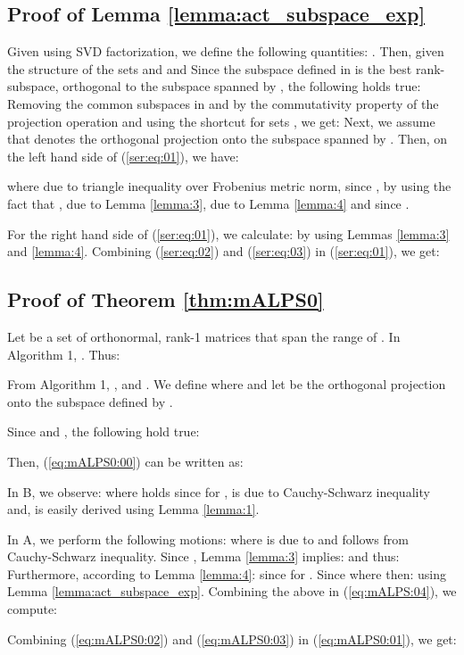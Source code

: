 \documentclass[twocolumn]{svjour3}
\begin{document}
\subsection{Proof of Lemma \ref{lemma:act_subspace_exp}}

Given  using SVD factorization, we define the following quantities: . Then, given the structure of the sets  and 
 and 
 Since the subspace defined in  is the best rank- subspace, orthogonal to the subspace spanned by , the following holds true:
 Removing the common subspaces in  and  by the commutativity property of the projection operation and using the shortcut  for sets , we get:
 Next, we assume that  denotes the orthogonal projection onto the subspace spanned by . Then, on the left hand side of (\ref{ser:eq:01}), we have:


 where  due to triangle inequality over Frobenius metric norm,  since ,  by using the fact that ,  due to Lemma \ref{lemma:3},  due to Lemma \ref{lemma:4} and  since .

For the right hand side of (\ref{ser:eq:01}), we calculate:
 by using Lemmas \ref{lemma:3} and \ref{lemma:4}. Combining (\ref{ser:eq:02}) and (\ref{ser:eq:03}) in (\ref{ser:eq:01}), we get:


\subsection{Proof of Theorem \ref{thm:mALPS0}}

Let  be a set of orthonormal, rank-1 matrices that span the range of . In Algorithm 1, . Thus:


From Algorithm 1, ,   and  . We define  where  and let  be the orthogonal projection onto the subspace defined by . 

Since  and , the following hold true:


Then, (\ref{eq:mALPS0:00}) can be written as:


In B, we observe:
 where  holds since  for ,  is due to Cauchy-Schwarz inequality and,  is easily derived using Lemma \ref{lemma:1}.

In A, we perform the following motions:
 where  is due to  and  follows from Cauchy-Schwarz inequality. Since , Lemma \ref{lemma:3} implies:
 and thus:
 Furthermore, according to Lemma \ref{lemma:4}:
 since  for . Since  where 
 then:
 using Lemma \ref{lemma:act_subspace_exp}. Combining the above in (\ref{eq:mALPS:04}), we compute:


Combining (\ref{eq:mALPS0:02}) and (\ref{eq:mALPS0:03}) in (\ref{eq:mALPS0:01}), we get:
\end{document}
